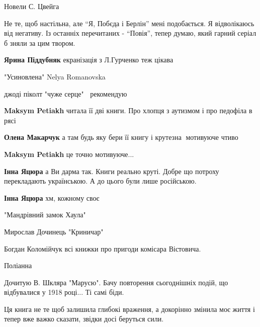 Новели С. Цвейга


Не те, щоб настільна, але \enquote{Я, Побєда і Берлін} мені подобається. Я відволікаюсь
від негативу. Із останніх перечитаних - \enquote{Повія}, тепер думаю, який гарний серіал
б зняли за цим твором.

\begin{itemize} %
\textbf{Ярина Піддубняк} екранізація з Л.Гурченко теж цікава
\end{itemize} %


"Усиновлена" Nelya Romanovska


джоді піколт "чуже серце"🤗🦋 рекомендую

\begin{itemize} %
\textbf{Maksym Petiakh} читала її дві книги. Про хлопця з аутизмом і про педофіла в рясі

\textbf{Олена Макарчук} а там будь яку бери її книгу і крутезна🤗 мотивуюче чтиво

\textbf{Maksym Petiakh} це точно мотивуюче... 🤭

\textbf{Інна Яцюра} а Ви дарма так. Книги реально круті. Добре що потроху перекладають українською. А до цього були лише російською.

\textbf{Інна Яцюра} хм, кожному своє🤔
\end{itemize} %


"Мандрівний замок Хаула"


Мирослав Дочинець "Криничар"


Богдан Коломійчук всі книжки про пригоди комісара Вістовича.


Поліанна 🌷


Дочитую В. Шкляра "Марусю". Бачу повторення сьогоднішніх подій, що відбувалися
у 1918 році... Ті самі біди.


Ця книга не те щоб залишила глибокі враження, а докорінно змінила моє життя і
тепер вже важко сказати, звідки досі беруться сили.

